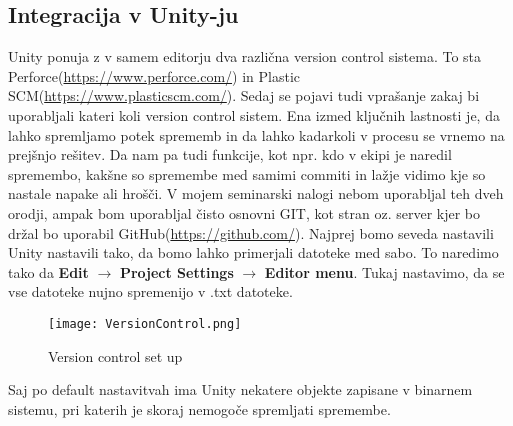 {\color{indiagreen}\subsection{Integracija v Unity-ju}}
Unity ponuja z v samem editorju dva različna version control sistema. To sta Perforce(\url{https://www.perforce.com/}) in Plastic SCM(\url{https://www.plasticscm.com/}). Sedaj se pojavi tudi vprašanje zakaj bi uporabljali kateri koli version control sistem. Ena izmed ključnih lastnosti je, da lahko spremljamo potek sprememb in da lahko kadarkoli v procesu se vrnemo na prejšnjo rešitev. Da nam pa tudi funkcije, kot npr. kdo v ekipi je naredil spremembo, kakšne so spremembe med samimi commiti in lažje vidimo kje so nastale napake ali hrošči. 
V mojem seminarski nalogi nebom uporabljal teh dveh orodji, ampak bom uporabljal čisto osnovni GIT, kot stran oz. server kjer bo držal bo uporabil GitHub(\url{https://github.com/}). 
Najprej bomo seveda nastavili Unity nastavili tako, da bomo lahko primerjali datoteke med sabo. To naredimo tako da \textbf{Edit} $\rightarrow$ \textbf{Project Settings} $\rightarrow$ \textbf{Editor menu}. Tukaj nastavimo, da se vse datoteke nujno spremenijo v .txt datoteke.\\
\begin{figure}[h]
	\centering
	\texttt{[image: VersionControl.png]}
	\caption{Version control set up}
\end{figure}
Saj po default nastavitvah ima Unity nekatere objekte zapisane v binarnem sistemu, pri katerih je skoraj nemogoče spremljati spremembe.

